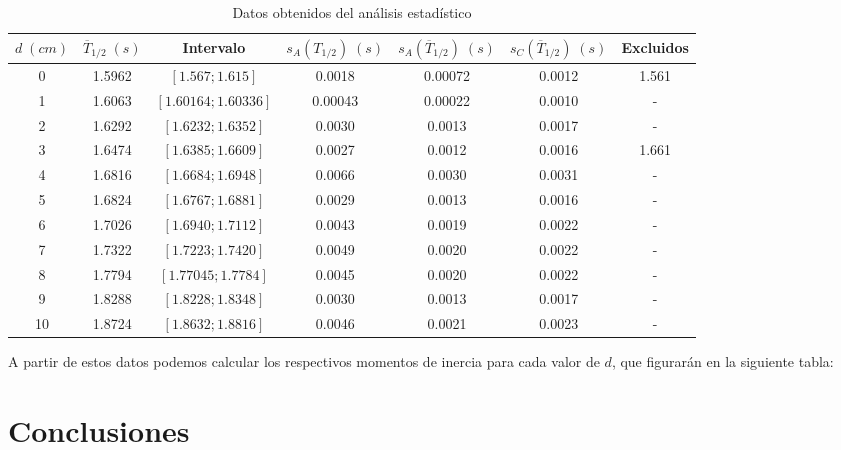 \documentclass[a4paper,12pt,titlepage]{article}
\begin{document}
\begin{table}[h!]
    \centering
    \begin{tabular}{|c|c|c|c|c|c|c|}
    \hline
    $d \; (cm)$ & $\overline{T}_{1/2} \; (s)$ & Intervalo & $s_A(T_{1/2}) \; (s)$ & $s_A(\overline{T}_{1/2}) \; (s)$ & $s_C(\overline{T}_{1/2}) \; (s)$ & Excluidos \\ \hline
    0  & 1.5962 & $[1.567;1.615]$     & 0.0018  & 0.00072 & 0.0012 & 1.561 \\ \hline
    1  & 1.6063 & $[1.60164;1.60336]$ & 0.00043 & 0.00022 & 0.0010 & -     \\ \hline
    2  & 1.6292 & $[1.6232;1.6352]$   & 0.0030  & 0.0013  & 0.0017 & -     \\ \hline
    3  & 1.6474 & $[1.6385;1.6609]$   & 0.0027  & 0.0012  & 0.0016 & 1.661 \\ \hline
    4  & 1.6816 & $[1.6684;1.6948]$   & 0.0066  & 0.0030  & 0.0031 & -     \\ \hline
    5  & 1.6824 & $[1.6767;1.6881]$   & 0.0029  & 0.0013  & 0.0016 & -     \\ \hline
    6  & 1.7026 & $[1.6940;1.7112]$   & 0.0043  & 0.0019  & 0.0022 & -     \\ \hline
    7  & 1.7322 & $[1.7223;1.7420]$   & 0.0049  & 0.0020  & 0.0022 & -     \\ \hline
    8  & 1.7794 & $[1.77045;1.7784]$  & 0.0045  & 0.0020  & 0.0022 & -     \\ \hline
    9  & 1.8288 & $[1.8228;1.8348]$   & 0.0030  & 0.0013  & 0.0017 & -     \\ \hline
    10 & 1.8724 & $[1.8632;1.8816]$   & 0.0046  & 0.0021  & 0.0023 & -     \\ \hline
    \end{tabular}
    \caption{Datos obtenidos del análisis estadístico}
    \label{Datos estadistica}
    \end{table}

A partir de estos datos podemos calcular los respectivos momentos de inercia para cada valor de $d$, que figurarán en la siguiente tabla:











\section{Conclusiones}
\end{document}
